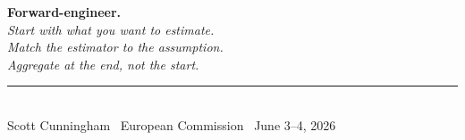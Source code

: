 \documentclass[aspectratio=169,11pt]{beamer}
\begin{document}
\begin{frame}[plain]
\centering
\vspace{2.5em}
{\Huge\bfseries\color{forest} Forward-engineer.}\\[1.5em]
{\Large\itshape\color{charcoal} Start with what you want to estimate.\\Match the estimator to the assumption.\\Aggregate at the end, not the start.}\\[2em]
\rule{0.4\textwidth}{0.6pt}\\[0.8em]
{\small\color{warmgray} Scott Cunningham \textperiodcentered\ European Commission \textperiodcentered\ June 3--4, 2026}
\end{frame}
\end{document}
